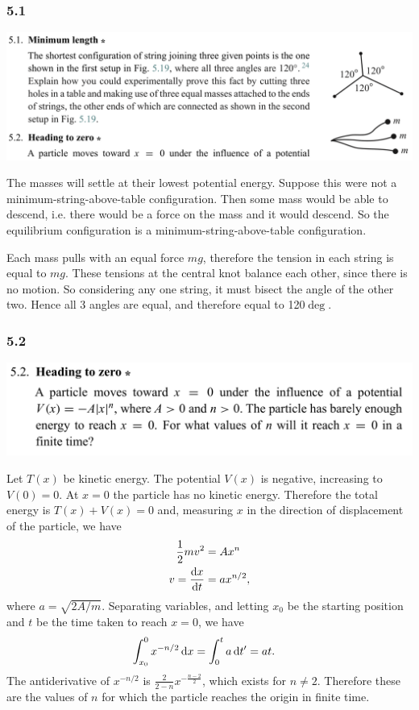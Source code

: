 \subsubsection*{5.1}
\begin{mdframed}
  \includegraphics[width=400pt]{img/physics--classical-mechanics--morin--5-1.png}
\end{mdframed}

The masses will settle at their lowest potential energy. Suppose this were not a
minimum-string-above-table configuration. Then some mass would be able to descend, i.e. there would
be a force on the mass and it would descend. So the equilibrium configuration is a
minimum-string-above-table configuration.

Each mass pulls with an equal force $mg$, therefore the tension in each string is equal to
$mg$. These tensions at the central knot balance each other, since there is no motion. So
considering any one string, it must bisect the angle of the other two. Hence all 3 angles are equal,
and therefore equal to 120$\deg$.

\subsubsection*{5.2}
\begin{mdframed}
  \includegraphics[width=400pt]{img/physics--classical-mechanics--morin--5-2.png}
\end{mdframed}

Let $T(x)$ be kinetic energy. The potential $V(x)$ is negative, increasing to $V(0) = 0$. At $x = 0$
the particle has no kinetic energy. Therefore the total energy is $T(x) + V(x) = 0$ and, measuring
$x$ in the direction of displacement of the particle, we have
\begin{align*}
  \frac{1}{2}mv^2 &= Ax^n \\
  v = \dxdt       &= a x^{n/2},
\end{align*}
where $a = \sqrt{2A/m}$. Separating variables, and letting $x_0$ be the starting position and $t$ be
the time taken to reach $x=0$, we have
\begin{align*}
  \int_{x_0}^0 x^{-n/2} \dx &= \int_0^t a\dt' = at.
\end{align*}
The antiderivative of $x^{-n/2}$ is $\frac{2}{2 - n}x^{-\frac{n - 2}{2}}$, which exists for
$n \neq 2$. Therefore these are the values of $n$ for which the particle reaches the origin in
finite time.

